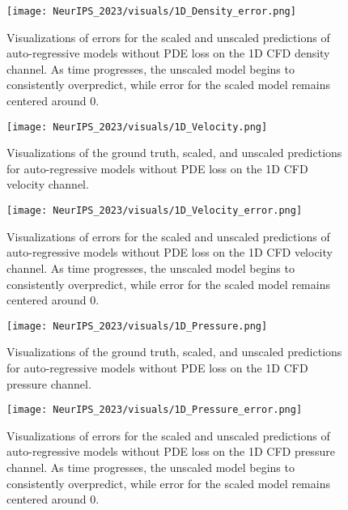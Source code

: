 \begin{figure}[h!]
    \centering
    \texttt{[image: NeurIPS\_2023/visuals/1D\_Density\_error.png]}
    \caption{Visualizations of errors for the scaled and unscaled predictions of auto-regressive models without PDE loss on the 1D CFD density channel. As time progresses, the unscaled model begins to consistently overpredict, while error for the scaled model remains centered around 0.}
    \label{fig:1d_rho_error}
\end{figure}

\newpage

\begin{figure}[h!]
    \centering
    \texttt{[image: NeurIPS\_2023/visuals/1D\_Velocity.png]}
    \caption{Visualizations of the ground truth, scaled, and unscaled predictions for auto-regressive models without PDE loss on the 1D CFD velocity channel.}
    \label{fig:1d_vel}
\end{figure}

\begin{figure}[h!]
    \centering
    \texttt{[image: NeurIPS\_2023/visuals/1D\_Velocity\_error.png]}
    \caption{Visualizations of errors for the scaled and unscaled predictions of auto-regressive models without PDE loss on the 1D CFD velocity channel. As time progresses, the unscaled model begins to consistently overpredict, while error for the scaled model remains centered around 0.}
    \label{fig:1d_vel_error}
\end{figure}

\newpage

\begin{figure}[h!]
    \centering
    \texttt{[image: NeurIPS\_2023/visuals/1D\_Pressure.png]}
    \caption{Visualizations of the ground truth, scaled, and unscaled predictions for auto-regressive models without PDE loss on the 1D CFD pressure channel.}
    \label{fig:1d_p}
\end{figure}

\begin{figure}[h!]
    \centering
    \texttt{[image: NeurIPS\_2023/visuals/1D\_Pressure\_error.png]}
    \caption{Visualizations of errors for the scaled and unscaled predictions of auto-regressive models without PDE loss on the 1D CFD pressure channel. As time progresses, the unscaled model begins to consistently overpredict, while error for the scaled model remains centered around 0.}
    \label{fig:1d_p_error}
\end{figure}

